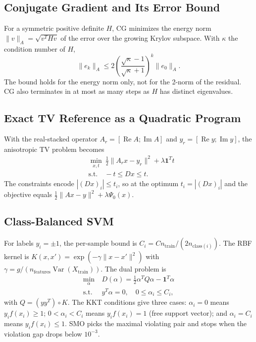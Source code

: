\documentclass[conference,a4paper]{IEEEtran}
\begin{document}
\subsection{Conjugate Gradient and Its Error Bound}
For a symmetric positive definite $H$, CG minimizes the energy norm $\|v\|_A=\sqrt{v^{T}Hv}$ of the error over the growing Krylov subspace. With $\kappa$ the condition number of $H$,
\begin{equation}
\|e_k\|_A\le 2\left(\frac{\sqrt{\kappa}-1}{\sqrt{\kappa}+1}\right)^{k}\|e_0\|_A .
\end{equation}
The bound holds for the energy norm only, not for the 2-norm of the residual. CG also terminates in at most as many steps as $H$ has distinct eigenvalues.

\subsection{Exact TV Reference as a Quadratic Program}
With the real-stacked operator $A_r=[\operatorname{Re}A;\operatorname{Im}A]$ and $y_r=[\operatorname{Re}y;\operatorname{Im}y]$, the anisotropic TV problem becomes
\begin{equation}
\begin{split}
&\min_{x,t}\ \tfrac12\|A_r x-y_r\|^2+\lambda\mathbf{1}^{T}t\\
&\text{s.t.}\quad -t\le Dx\le t .
\end{split}
\end{equation}
The constraints encode $|(Dx)_i|\le t_i$, so at the optimum $t_i=|(Dx)_i|$ and the objective equals $\tfrac12\|Ax-y\|^2+\lambda\Psi_0(x)$.

\subsection{Class-Balanced SVM}
For labels $y_i=\pm1$, the per-sample bound is \mbox{$C_i=C n_{\mathrm{train}}/(2n_{\mathrm{class}(i)})$}. The RBF kernel is $K(x,x')=\exp(-\gamma\|x-x'\|^2)$ with $\gamma=g/(n_{\mathrm{features}}\operatorname{Var}(X_{\mathrm{train}}))$. The dual problem is
\begin{equation}
\begin{aligned}
\min_{\alpha}\ & D(\alpha)=\tfrac12\alpha^{T}Q\alpha-\mathbf{1}^{T}\alpha\\
\text{s.t.}\ & y^{T}\alpha=0,\quad 0\le\alpha_i\le C_i,
\end{aligned}
\end{equation}
with $Q=(yy^{T})\circ K$. The KKT conditions give three cases: $\alpha_i=0$ means $y_if(x_i)\ge1$; $0<\alpha_i<C_i$ means $y_if(x_i)=1$ (free support vector); and $\alpha_i=C_i$ means $y_if(x_i)\le1$. SMO picks the maximal violating pair and stops when the violation gap drops below $10^{-3}$.
\end{document}
